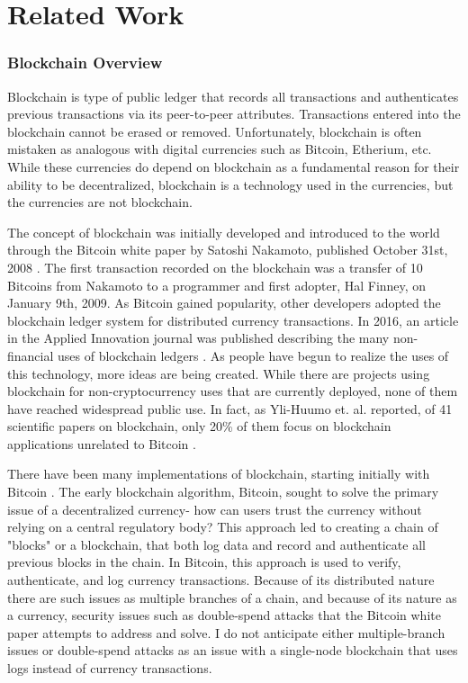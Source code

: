 \chapter{Related Work}
\label{relwork}
\subsection{Blockchain Overview}
        Blockchain is type of public ledger that records all transactions and authenticates previous transactions via its peer-to-peer attributes. Transactions entered into the blockchain cannot be erased or removed. Unfortunately, blockchain is often mistaken as analogous with digital currencies such as Bitcoin, Etherium, etc. While these currencies do depend on blockchain as a fundamental reason for their ability to be decentralized, blockchain is a technology used in the currencies, but the currencies are not blockchain. 
        
        The concept of blockchain was initially developed and introduced to the world through the Bitcoin white paper by Satoshi Nakamoto, published October 31st, 2008 \cite{Bitcoin}. The first transaction recorded on the blockchain was a transfer of 10 Bitcoins from Nakamoto to a programmer and first adopter, Hal Finney, on January 9th, 2009. As Bitcoin gained popularity, other developers adopted the blockchain ledger system for distributed currency transactions. In 2016, an article in the Applied Innovation journal was published describing the many non-financial uses of blockchain ledgers \cite{BlockchainTechUses}. As people have begun to realize the uses of this technology, more ideas are being created. While there are projects using blockchain for non-cryptocurrency uses that are currently deployed, none of them have reached widespread public use. In fact, as Yli-Huumo et. al. reported, of 41 scientific papers on blockchain, only 20\% of them focus on blockchain applications unrelated to Bitcoin \cite{BlockchainResearch}.
        
        There have been many implementations of blockchain, starting initially with Bitcoin \cite{Bitcoin}.
        The early blockchain algorithm, Bitcoin, sought to solve the primary issue of a decentralized currency- how can users trust the currency without relying on a central regulatory body?  This approach led to creating a chain of "blocks" or a blockchain, that both log data and record and authenticate all previous blocks in the chain. In Bitcoin, this approach is used to verify, authenticate, and log currency transactions. Because of its distributed nature there are such issues as multiple branches of a chain, and because of its nature as a currency, security issues such as double-spend attacks \cite{Bitcoin} that the Bitcoin white paper attempts to address and solve. I do not anticipate either multiple-branch issues or double-spend attacks as an issue with a single-node blockchain that uses logs instead of currency transactions. 
        

